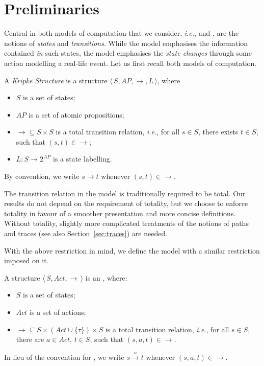 \documentclass{llncs}
\newcommand{\ltstrans}[1]{\xrightarrow{#1}}
\newcommand{\ie}{\emph{i.e.}}
\begin{document}
\section{Preliminaries}\label{Sect:preliminaries}

Central in both models of computation that we consider, \ie, \KS and
\LTS, are the notions of \emph{states} and \emph{transitions}. While the
\KS model emphasises the information contained \emph{in} such states,
the \LTS model emphasises the \emph{state changes} through some action
modelling a real-life event. Let us first recall both models of computation.

\newcommand{\AP}{\ensuremath{AP\xspace}}
\newcommand{\tuple}[1]{\ensuremath{\langle\,{#1}\,\rangle}}
\begin{definition}
A \emph{Kripke Structure} is a structure $\tuple{S, \AP, \to, L}$, where
\begin{itemize}
\item $S$ is a set of states;

\item $\AP$ is a set of atomic propositions;

\item $\to \subseteq S \times S$ is a total transition relation, \ie, for
all $s \in S$, there exists $t \in S$, such that $(s,t) \in\to$;

\item $L : S \to 2^{\AP}$ is a state labelling.
\end{itemize}
\end{definition}
By convention, we write $s \to t$ whenever $(s,t) \in \to$.

\begin{remark}
The transition relation in the \KS model is traditionally required to be
total. Our results do not depend on the requirement of totality, but
we choose to enforce totality in favour of a smoother presentation and
more concise definitions. Without totality,
slightly more complicated treatments of the notions of paths and traces
(see also Section~\ref{sec:traces}) are needed.
\end{remark}
With the above restriction in mind, we define the \LTS model with
a similar restriction imposed on it.

\newcommand{\act}{\ensuremath{A}ct}
\begin{definition}
A structure $\tuple{S,\act,\ltstrans{}}$ is an \LTS, where:
\begin{itemize}
\item $S$ is a set of states;
\item $\act$ is a set of actions;
\item $\ltstrans{} \subseteq S \times (\act \cup \{\tau\}) \times S$ is a total
transition relation,
\ie, for all $s \in S$, there are $a \in \act$, $t \in S$, such that
$(s,a,t) \in \ltstrans{}$.
\end{itemize}
\end{definition}
In lieu of the convention for \KS, we write $s \ltstrans{a} t$ whenever
$(s,a,t) \in \ltstrans{}$.
\end{document}
